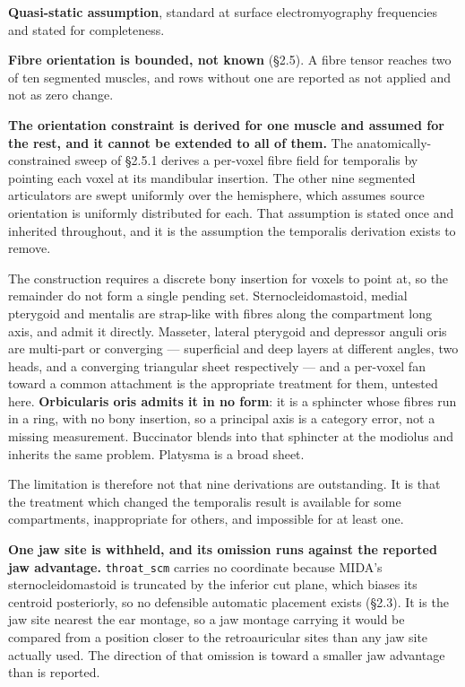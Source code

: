 \documentclass[
  11pt,
  a4paper,
]{article}
\begin{document}
\textbf{Quasi-static assumption}, standard at surface electromyography frequencies
and stated for completeness.

\textbf{Fibre orientation is bounded, not known} (§2.5). A fibre tensor reaches two
of ten segmented muscles, and rows without one are reported as not applied and
not as zero change.

\textbf{The orientation constraint is derived for one muscle and assumed for the rest,
and it cannot be extended to all of them.} The anatomically-constrained sweep of
§2.5.1 derives a per-voxel fibre field for temporalis by pointing each voxel at
its mandibular insertion. The other nine segmented articulators are swept
uniformly over the hemisphere, which assumes source orientation is uniformly
distributed for each. That assumption is stated once and inherited throughout,
and it is the assumption the temporalis derivation exists to remove.

The construction requires a discrete bony insertion for voxels to point at, so
the remainder do not form a single pending set. Sternocleidomastoid, medial
pterygoid and mentalis are strap-like with fibres along the compartment long
axis, and admit it directly. Masseter, lateral pterygoid and depressor anguli
oris are multi-part or converging --- superficial and deep layers at different
angles, two heads, and a converging triangular sheet respectively --- and a
per-voxel fan toward a common attachment is the appropriate treatment for them,
untested here. \textbf{Orbicularis oris admits it in no form}: it is a sphincter
whose fibres run in a ring, with no bony insertion, so a principal axis is a
category error, not a missing measurement. Buccinator blends into that sphincter
at the modiolus and inherits the same problem. Platysma is a broad sheet.

The limitation is therefore not that nine derivations are outstanding. It is that
the treatment which changed the temporalis result is available for some
compartments, inappropriate for others, and impossible for at least one.

\textbf{One jaw site is withheld, and its omission runs against the reported jaw
advantage.} \texttt{throat\_scm} carries no coordinate because MIDA's
sternocleidomastoid is truncated by the inferior cut plane, which biases its
centroid posteriorly, so no defensible automatic placement exists (§2.3). It is
the jaw site nearest the ear montage, so a jaw montage carrying it would be
compared from a position closer to the retroauricular sites than any jaw site
actually used. The direction of that omission is toward a smaller jaw advantage
than is reported.
\end{document}
